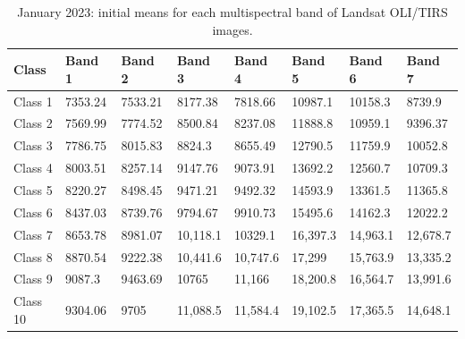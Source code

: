 \documentclass[geomatics,article,accept,pdftex,oneauthor]{Definitions/mdpi}
\begin{document}
\vspace{-3pt}
\begin{table}[H]
\caption{January 2023: initial means for each multispectral band of Landsat OLI/TIRS images.}

\begin{tabularx}{\textwidth}{ p{1.5cm} X  X  X X  X  XX }
\toprule \textbf{Class} & \textbf{Band 1} & \textbf{Band 2} & \textbf{Band 3} & \textbf{Band 4} & \textbf{Band 5} & \textbf{Band 6} & \textbf{Band 7} \\  \midrule
    Class 1 & 7353.24 & 7533.21 & 8177.38 & 7818.66 & 10987.1 & 10158.3 & 8739.9 \\
    Class 2 & 7569.99 & 7774.52 & 8500.84 & 8237.08 & 11888.8 & 10959.1 & 9396.37 \\
    Class 3 & 7786.75 & 8015.83 & 8824.3 & 8655.49 & 12790.5 & 11759.9 & 10052.8 \\
    Class 4 & 8003.51 & 8257.14 & 9147.76 & 9073.91 & 13692.2 & 12560.7 & 10709.3 \\
    Class 5 & 8220.27 & 8498.45 & 9471.21 & 9492.32 & 14593.9 & 13361.5 & 11365.8 \\
    Class 6 & 8437.03 & 8739.76 & 9794.67 & 9910.73 & 15495.6 & 14162.3 & 12022.2 \\
    Class 7 & 8653.78 & 8981.07 & 10,118.1 & 10329.1 & 16,397.3 & 14,963.1 & 12,678.7 \\
    Class 8 & 8870.54 & 9222.38 & 10,441.6 & 10,747.6 & 17,299 & 15,763.9 & 13,335.2 \\
    Class 9 & 9087.3 & 9463.69 & 10765 & 11,166 & 18,200.8 & 16,564.7 & 13,991.6 \\
    Class 10 & 9304.06 & 9705 & 11,088.5 & 11,584.4 & 19,102.5 & 17,365.5 & 14,648.1 \\
    \bottomrule
\end{tabularx}
\label{tabA01}
\end{table}
\end{document}

